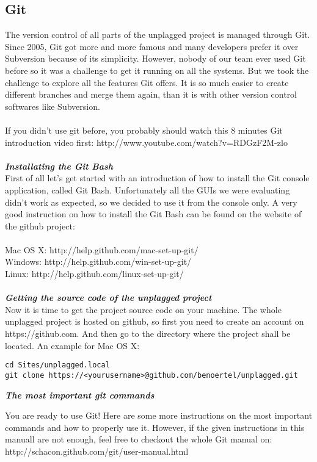 \subsection{Git}
The version control of all parts of the unplagged project is managed through Git. Since 2005, Git got more and more famous and many developers prefer it over Subversion because of its simplicity. However, nobody of our team ever used Git before so it was a challenge to get it running on all the systems. But we took the challenge to explore all the features Git offers. It is so much easier to create different branches and merge them again, than it is with other version control softwares like Subversion.\\
\\
If you didn't use git before, you probably should watch this 8 minutes Git introduction video first:
http://www.youtube.com/watch?v=RDGzF2M-zlo\\
\\
\textbf{\textit{Installating the Git Bash}}
\\
First of all let's get started with an introduction of how to install the Git console application, called Git Bash. Unfortunately all the GUIs we were evaluating didn't work as expected, so we decided to use it from the console only. A very good instruction on how to install the Git Bash can be found on the website of the github project:
\\
\\
Mac OS X: http://help.github.com/mac-set-up-git/
\\
Windows: http://help.github.com/win-set-up-git/
\\
Linux: http://help.github.com/linux-set-up-git/
\\
\\
\textbf{\textit{Getting the source code of the unplagged project}}
\\
Now it is time to get the project source code on your machine. The whole unplagged project is hosted on github, so first you need to create an account on https://github.com. And then go to the directory where the project shall be located. An example for Mac OS X:

\begin{verbatim}
cd Sites/unplagged.local
git clone https://<yourusername>@github.com/benoertel/unplagged.git
\end{verbatim}

\textbf{\textit{The most important git commands}}

You are ready to use Git! Here are some more instructions on the most important commands and how to properly use it. However, if the given instructions in this manuall are not enough, feel free to checkout the whole Git manual on: http://schacon.github.com/git/user-manual.html

